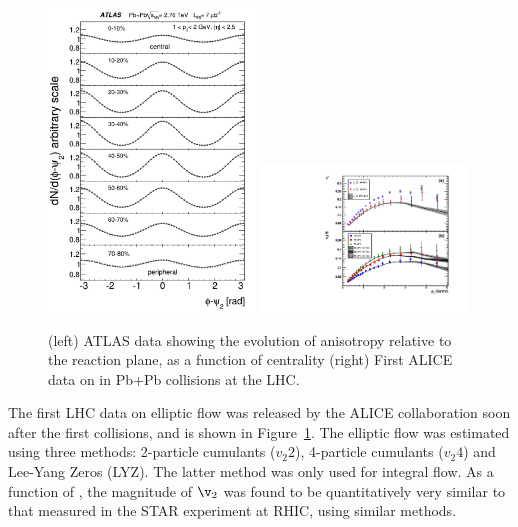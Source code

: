 \begin{figure}[!htb]
\begin{center}
\includegraphics[width=0.49\textwidth]{flowcorrelations_figs/atlas_v2_fig_02.pdf}
\includegraphics[width=0.49\textwidth]{flowcorrelations_figs/fig2.pdf}
\caption[]{(left) ATLAS data showing the evolution of anisotropy relative to the reaction plane, as a function of centrality (right) First ALICE data on \vtwo in Pb+Pb collisions at the LHC.}
\label{fig:pas:fc:firstreusults}
\end{center}
\end{figure}
The first LHC data on elliptic flow was released by the ALICE collaboration soon after the first collisions, 
and is shown in Figure~\ref{fig:pas:fc:firstreusults}.
The elliptic flow was estimated using three methods: 2-particle cumulants ($v_2{2}$), 4-particle cumulants ($v_2{4}$)
and Lee-Yang Zeros (LYZ).  The latter method was only used for integral flow.  
As a function of \pT, the magnitude of $\v_2$ was found to be quantitatively very similar to that measured in
the STAR experiment at RHIC, using similar methods.

